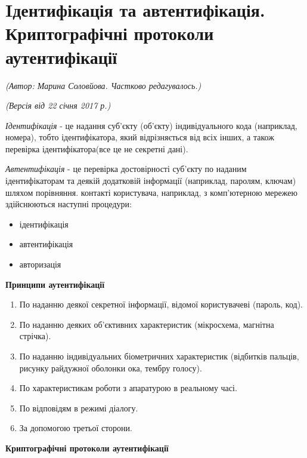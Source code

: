 \section{Iдентифікація та автентифікація. Криптографічні протоколи аутентифікації}
\begin{flushright}
\emph{(Автор: Марина Соловйова. Частково редагувалось.)}
\par \emph{(Версія від 22 січня 2017 р.)}
\end{flushright}

\par\emph{Ідентифікація} - це надання суб'єкту (об'єкту) індивідуального кода (наприклад, номера), тобто ідентифікатора, який відрізняється від всіх інших, а також перевірка ідентифікатора(все це не секретні дані). \par
\emph{Автентифікація} - це перевірка достовірності суб'єкту по наданим ідентифікаторам та деякій додатковій інформації (наприклад, паролям, ключам) шляхом порівняння.
 контакті користувача, наприклад, з комп'ютерною мережею здійснюються наступні процедури:

\begin{itemize}
\item ідентифікація
\item автентифікація
\item авторизація
\end{itemize}

\begin{center}
\textbf{Принципи аутентифікації}
\end{center}

\begin{enumerate}
\setcounter{enumi}{0}
\item По наданню деякої секретної інформації, відомої користувачеві (пароль, код).
\item По наданню деяких об'єктивних характеристик (мікросхема, магнітна стрічка).
\item По наданню індивідуальних біометричних характеристик (відбитків пальців, рисунку райдужної оболонки ока, тембру голосу).
\item По характеристикам роботи з апаратурою в реальному часі.
\item По відповідям в режимі діалогу.
\item За допомогою третьої сторони.
\end{enumerate}

\begin{center}
\textbf{Криптографічні протоколи аутентифікації}
\end{center}


